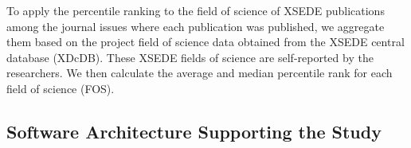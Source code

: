 \documentclass{sig-alternate}
\begin{document}
To apply the percentile ranking to the field of science of XSEDE
publications among the journal issues where each publication was
published, we aggregate them based on the project field
of science data obtained from the XSEDE central database
(XDcDB). These XSEDE fields of science are self-reported by the
researchers. We then calculate the average and median percentile rank
for each field of science (FOS).

\subsection{Software Architecture Supporting the Study}
\end{document}

